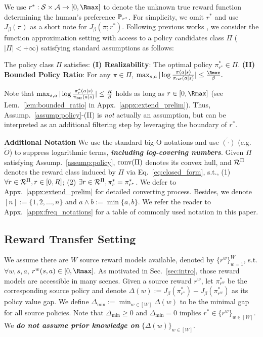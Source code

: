 We use $r^*:\cS\times\cA\rightarrow[0, {\Rmax}]$ to denote the unknown true reward function determining the human's preference ${\mathbb{P}}_{r^*}$. 
For simplicity, we omit $r^*$ and use $J_\beta(\pi)$ as a short note for $J_\beta(\pi;r^*)$.
Following previous works \citep{xie2024exploratory,zhang2024self}, we consider the function approximation setting with access to a policy candidates class $\Pi$ ($|\Pi| < +\infty$) satisfying standard assumptions as follows:
%
\begin{assumption}\label{assump:policy} The policy class $\Pi$ satisfies:
        \textbf{(I) Realizability}: The optimal policy $\pi^*_{r^*} \in \Pi$.
        \textbf{(II) Bounded Policy Ratio}: 
            For any $\pi\in\Pi$, $
            \max_{s,a} |\log\frac
            {\pi(a|s)}{\pi_\textref(a|s)}| \leq \frac{{\Rmax}}{\beta}.
            $
\end{assumption}
Note that $\max_{s,a}|\log\frac{\pi^*_{r}(a|s)}{\pi_{\texttt{ref}}(a|s)}| \leq \frac{R}{\beta}$ holds as long as $r\in[0, \Rmax]$ (see Lem.~\ref{lem:bounded_ratio} in Appx.~\ref{appx:extend_prelim}).
Thus, Assump.~\ref{assump:policy}-(II) is \emph{not} actually an assumption, but can be interpreted as an additional filtering step by leveraging the boundary of $r^*$.
%
%


%
%
%
%
%
%
%
%


%
%
%
%
%
%
%
%

\textbf{Additional Notation}
We use the standard big-O notations and use $\tilde{(\cdot)}$ (e.g. $\tilde{O}$) to suppress logarithmic terms, \textbf{\emph{including log-covering numbers}}.
Given $\Pi$ satisfying Assump.~\ref{assump:policy}, $\text{conv}(\Pi)$ denotes its convex hull, and $\mathcal{R}^{\Pi}$ denotes the reward class induced by $\Pi$ via Eq.~\eqref{eq:closed_form}, s.t., (1) $\forall r\in\mathcal{R}^\Pi, r\in[0, R]$; (2) $\exists r\in\mathcal{R}^{\Pi}, \pi_r^* = \pi^*_{r^*}$.
We defer to Appx.~\ref{appx:extend_prelim} for detailed converting process.
%
Besides, we denote $[n] := \{1,2,...,n\}$ and $a\wedge b := \min\{a,b\}$.
We refer the reader to Appx.~\ref{appx:freq_notations} for a table of commonly used notation in this paper.


\subsection{Reward Transfer Setting}\label{sec:transfer_setting}
We assume there are $W$ source reward models available, denoted by $\{r^w\}_{w=1}^W$, s.t. $\forall w, s,a$, $r^w(s,a) \in [0, {\Rmax}]$.
As motivated in Sec.~\ref{sec:intro}, those reward models are accessible in many scenes.
%
%
%
Given a source reward $r^w$, let $\pi^*_{r^w}$ be the corresponding source policy and denote $\Delta(w) := J_\beta(\pi^*_{r^*}) - J_\beta(\pi^*_{r^w})$ as its policy value gap.
We define $\Delta_{\min} := \min_{w\in[W]} \Delta(w)$ to be the minimal gap for all source policies.
Note that $\Delta_{\min} \geq 0$ and $\Delta_{\min} = 0$ implies $r^* \in \{r^w\}_{w\in[W]}$.
We \textbf{\emph{do not assume prior knowledge on}} $\{\Delta(w)\}_{w\in[W]}$.
%
%
%
%

